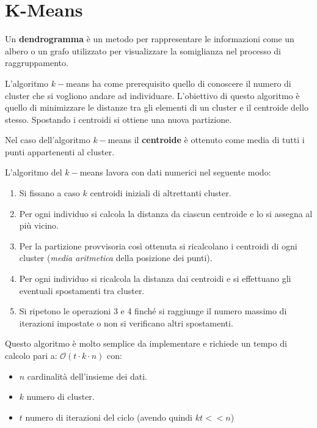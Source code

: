 \section{K-Means}
\begin{definizione}
    Un \textbf{dendrogramma} è un metodo per rappresentare le informazioni come
    un albero o un grafo utilizzato per visualizzare la somiglianza nel processo
    di raggruppamento.
\end{definizione}
L'algoritmo $k-$means ha come prerequisito quello di conoscere il numero di
cluster che si vogliono andare ad individuare. L'obiettivo di questo algoritmo è
quello di minimizzare le distanze tra gli elementi di un cluster e il centroide
dello stesso. Spostando i centroidi si ottiene una nuova partizione.
\begin{definizione}
    Nel caso dell'algoritmo $k-$means il \textbf{centroide} è ottenuto come media
    di tutti i punti appartenenti al cluster.
\end{definizione}
L'algoritmo del $k-$means lavora con dati numerici nel seguente modo:
\begin{enumerate}
    \item Si fissano a caso $k$ centroidi iniziali di altrettanti cluster.
    \item Per ogni individuo si calcola la distanza da ciascun centroide e lo si
          assegna al più vicino.
    \item Per la partizione provvisoria così ottenuta si ricalcolano i centroidi
          di ogni cluster (\textit{media aritmetica} della posizione dei punti).
    \item Per ogni individuo si ricalcola la distanza dai centroidi e si
          effettuano gli eventuali spostamenti tra cluster.
    \item Si ripetono le operazioni 3 e 4 finché si raggiunge il numero massimo
          di iterazioni impostate o non si verificano altri spostamenti.
\end{enumerate}
Questo algoritmo è molto semplice da implementare e richiede un tempo di calcolo
pari a: $\mathcal{O}(t \cdot k \cdot n)$ con:
\begin{itemize}
    \item $n$ cardinalità dell'insieme dei dati.
    \item $k$ numero di cluster.
    \item $t$ numero di iterazioni del ciclo (avendo quindi $kt << n$)
\end{itemize}
